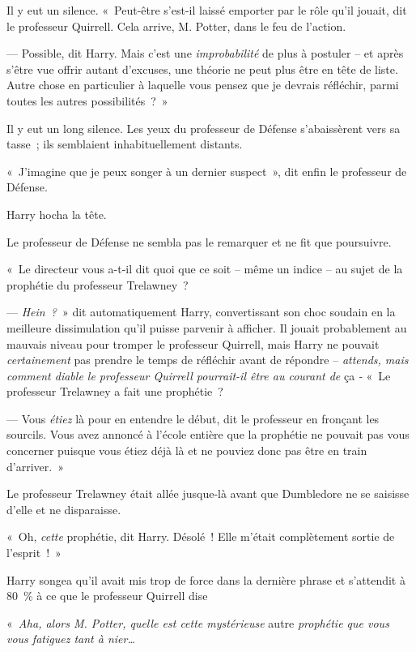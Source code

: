 Il y eut un silence.
«~Peut-être s'est-il laissé emporter par le rôle qu'il jouait, dit le professeur Quirrell.
Cela arrive, M. Potter, dans le feu de l'action.

--- Possible, dit Harry.
Mais c'est une \emph{improbabilité} de plus à postuler -- et après s'être vue offrir autant d'excuses, une théorie ne peut plus être en tête de liste.
Autre chose en particulier à laquelle vous pensez que je devrais réfléchir, parmi toutes les autres possibilités~?~»

Il y eut un long silence.
Les yeux du professeur de Défense s'abaissèrent vers sa tasse~; ils semblaient inhabituellement distants.

«~J'imagine que je peux songer à un dernier suspect~», dit enfin le professeur de Défense.

Harry hocha la tête.

Le professeur de Défense ne sembla pas le remarquer et ne fit que poursuivre.

«~Le directeur vous a-t-il dit quoi que ce soit -- même un indice -- au sujet de la prophétie du professeur Trelawney~?

--- \emph{Hein~?}~» dit automatiquement Harry, convertissant son choc soudain en la meilleure dissimulation qu'il puisse parvenir à afficher.
Il jouait probablement au mauvais niveau pour tromper le professeur Quirrell, mais Harry ne pouvait \emph{certainement} pas prendre le temps de réfléchir avant de répondre -- \emph{attends, mais comment diable le professeur Quirrell pourrait-il être au courant de} ça \emph{-} «~Le professeur Trelawney a fait une prophétie~?

--- Vous \emph{étiez} là pour en entendre le début, dit le professeur en fronçant les sourcils.
Vous avez annoncé à l'école entière que la prophétie ne pouvait pas vous concerner puisque vous étiez déjà là et ne pouviez donc pas être en train d'arriver.~»


Le professeur Trelawney était allée jusque-là avant que Dumbledore ne se saisisse d'elle et ne disparaisse.

«~Oh, \emph{cette} prophétie, dit Harry.
Désolé~!
Elle m'était complètement sortie de l'esprit~!~»

Harry songea qu'il avait mis trop de force dans la dernière phrase et s'attendit à 80~\% à ce que le professeur Quirrell dise

«~\emph{Aha, alors M. Potter, quelle est cette mystérieuse} autre \emph{prophétie que vous vous fatiguez tant à nier…}

